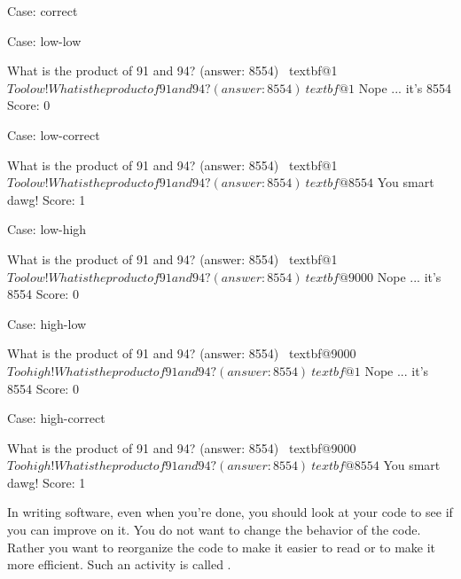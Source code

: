 Case: correct\\

Case: low-low\\
\begin{console}[commandchars=\~\@\$]
What is the product of 91 and 94? (answer: 8554) ~textbf@1$
Too low!
What is the product of 91 and 94? (answer: 8554) ~textbf@1$
Nope ... it's 8554
Score: 0 
\end{console}

Case: low-correct\\
\begin{console}[commandchars=\~\@\$]
What is the product of 91 and 94? (answer: 8554) ~textbf@1$
Too low!
What is the product of 91 and 94? (answer: 8554) ~textbf@8554$
You smart dawg!
Score: 1 
\end{console}

Case: low-high\\
\begin{console}[commandchars=\~\@\$]
What is the product of 91 and 94? (answer: 8554) ~textbf@1$
Too low!
What is the product of 91 and 94? (answer: 8554) ~textbf@9000$
Nope ... it's 8554
Score: 0
\end{console}

Case: high-low\\
\begin{console}[commandchars=\~\@\$]
What is the product of 91 and 94? (answer: 8554) ~textbf@9000$
Too high!
What is the product of 91 and 94? (answer: 8554) ~textbf@1$
Nope ... it's 8554
Score: 0
\end{console}

Case: high-correct\\
\begin{console}[commandchars=\~\@\$]
What is the product of 91 and 94? (answer: 8554) ~textbf@9000$
Too high!
What is the product of 91 and 94? (answer: 8554) ~textbf@8554$
You smart dawg!
Score: 1
\end{console}


\newpage{}

In writing software, even when you're done, you should
look at your code to see if you can improve on it. You do not want to
change the behavior of the code. Rather you want to reorganize the code
to make it easier to read or to make it more efficient. Such an activity
is called .

